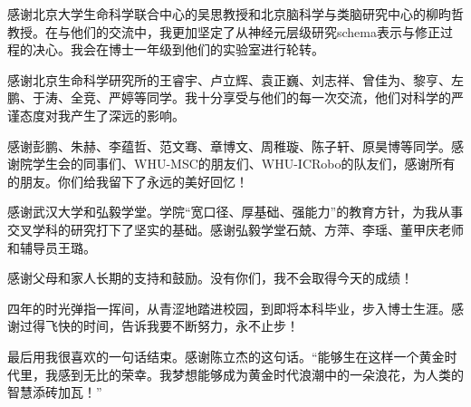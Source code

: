 \begin{acknowledgements}
  感谢北京大学生命科学联合中心的吴思教授和北京脑科学与类脑研究中心的柳昀哲教授。在与他们的交流中，我更加坚定了从神经元层级研究schema表示与修正过程的决心。我会在博士一年级到他们的实验室进行轮转。

  感谢北京生命科学研究所的王睿宇、卢立辉、袁正巍、刘志祥、曾佳为、黎亨、左鹏、于涛、全竞、严婷等同学。我十分享受与他们的每一次交流，他们对科学的严谨态度对我产生了深远的影响。

  感谢彭鹏、朱赫、李蕴哲、范文骞、章博文、周稚璇、陈子轩、原昊博等同学。感谢院学生会的同事们、WHU-MSC的朋友们、WHU-ICRobo的队友们，感谢所有的朋友。你们给我留下了永远的美好回忆！

  感谢武汉大学和弘毅学堂。学院“宽口径、厚基础、强能力”的教育方针，为我从事交叉学科的研究打下了坚实的基础。感谢弘毅学堂石兢、方萍、李瑶、董甲庆老师和辅导员王璐。

  感谢父母和家人长期的支持和鼓励。没有你们，我不会取得今天的成绩！

  四年的时光弹指一挥间，从青涩地踏进校园，到即将本科毕业，步入博士生涯。感谢过得飞快的时间，告诉我要不断努力，永不止步！

  最后用我很喜欢的一句话结束。感谢陈立杰的这句话。“能够生在这样一个黄金时代里，我感到无比的荣幸。我梦想能够成为黄金时代浪潮中的一朵浪花，为人类的智慧添砖加瓦！”
\end{acknowledgements}

